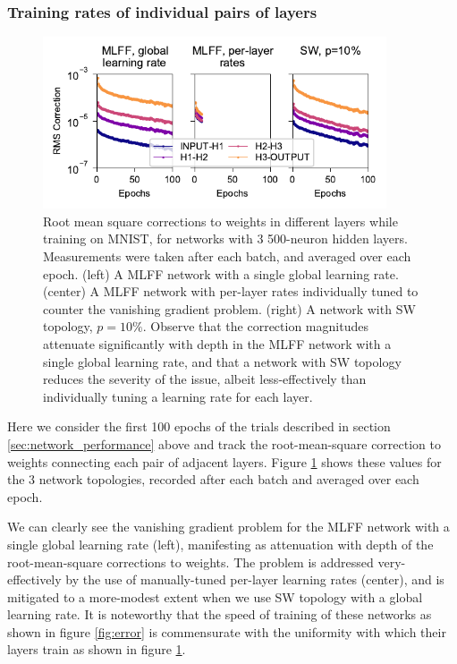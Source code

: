 \documentclass[utf8]{frontiersSCNS}
\begin{document}
\subsubsection{Training rates of individual pairs of layers}\label{sec:rates}

\label{sec:mnist_perlayer}
\begin{figure}
	\centering
	\includegraphics[width=4in]{figures/mnist_3layer_rates.pdf}
	\caption{Root mean square corrections to weights in different layers while training on MNIST, for networks with 3 500-neuron hidden layers. Measurements were taken after each batch, and averaged over each epoch. (left) A MLFF network with a single global learning rate. (center) A MLFF network with per-layer rates individually tuned to counter the vanishing gradient problem. (right) A network with SW topology, $p=10\%$. Observe that the correction magnitudes attenuate significantly with depth in the MLFF network with a single global learning rate, and that a network with SW topology reduces the severity of the issue, albeit less-effectively than individually tuning a learning rate for each layer.}
	\label{fig:rates}
\end{figure}

Here we consider the first 100 epochs of the trials described in section \ref{sec:network_performance} above and track the root-mean-square correction to weights connecting each pair of adjacent layers. Figure \ref{fig:rates} shows these values for the 3 network topologies, recorded after each batch and averaged over each epoch.

We can clearly see the vanishing gradient problem for the MLFF network with a single global learning rate (left), manifesting as attenuation with depth of the root-mean-square corrections to weights. The problem is addressed very-effectively by the use of manually-tuned per-layer learning rates (center), and is mitigated to a more-modest extent when we use SW topology with a global learning rate. It is noteworthy that the speed of training of these networks as shown in figure \ref{fig:error} is commensurate with the uniformity with which their layers train as shown in figure \ref{fig:rates}.
\end{document}
